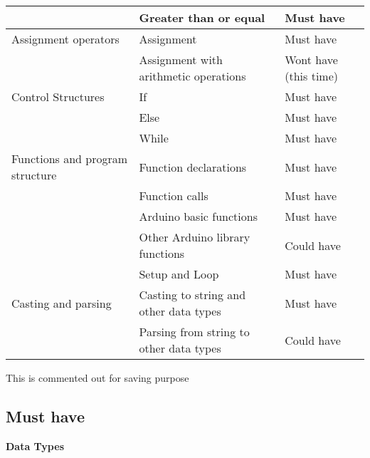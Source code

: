 \begin{table}[H]
\begin{tabular}{@{}lll@{}}
                       & Greater than or equal   & Must have                       \\ \midrule
Assignment operators   & Assignment              & Must have                       \\
                       & Assignment with 
                         arithmetic operations   & Wont have (this time)          \\ \midrule
Control Structures     & If                      & Must have                       \\
                       & Else                    & Must have                       \\
                       & While                   & Must have                       \\\midrule
Functions and program structure     & Function declarations             & Must have \\
                                    & Function calls                    & Must have \\ 
                                    & Arduino basic functions           & Must have \\ 
                                    & Other Arduino library functions   & Could have \\
                                    & Setup and Loop                    & Must have \\ \midrule
Casting and parsing                 & Casting to string and other data types         & Must have \\
                                    & Parsing from string to other data types        & Could have \\ \midrule
                       
\end{tabular}
\end{table}

\iffalse 
This is commented out for saving purpose
\subsection{Must have}
\textbf{Data Types} 

